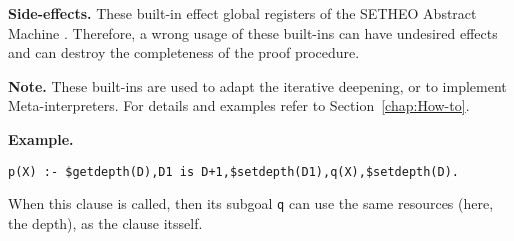 \vspace*{0.5cm}
\noindent
{\bf Side-effects.}
These built-in effect global registers of the SETHEO Abstract Machine
\SAM.
Therefore, a wrong usage of these built-ins can have undesired effects
and can destroy the completeness of the proof procedure.

\vspace*{0.5cm}
\noindent
{\bf Note.}
These built-ins are used to adapt the iterative deepening, or to implement
Meta-interpreters. For details and examples refer to Section~\ref{chap:How-to}.

\vspace*{0.5cm}
\noindent
{\bf Example.}
\begin{verbatim}
p(X) :- $getdepth(D),D1 is D+1,$setdepth(D1),q(X),$setdepth(D).
\end{verbatim}

When this clause is called, then its subgoal {\tt q} can use  the same
resources (here, the depth), as the clause itsself.
